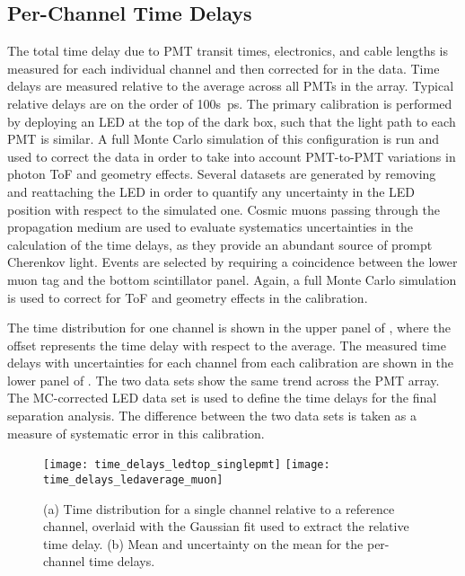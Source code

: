 \subsection{Per-Channel Time Delays}\label{s:delay}

The total time delay due to PMT transit times, electronics, and cable lengths is measured for each individual channel and then corrected for in the data. 
Time delays are measured relative to the average across all PMTs in the array. 
Typical relative delays are on the order of 100s~ps. 
The primary calibration is performed by deploying an LED at the top of the dark box, such that the light path to each PMT is similar.  A full Monte Carlo simulation of this configuration is run and used to correct the data in order to take into account PMT-to-PMT variations in photon ToF and geometry effects.  
Several datasets are generated by removing and reattaching the LED in order to quantify any uncertainty in the LED position with respect to the simulated one. 
Cosmic muons passing through the propagation medium are used to evaluate systematics uncertainties in the calculation of the time delays, as they provide an abundant source of prompt Cherenkov light. Events are selected  by requiring a coincidence between the lower muon tag and the bottom scintillator panel. Again, a full Monte Carlo simulation is used to correct for ToF and geometry effects in the calibration.  

The time distribution for one channel is shown in the upper panel of , where the offset represents the time delay with respect to the average. 
The measured time delays with uncertainties for each channel from each calibration are shown in the lower panel of .  The two data sets show the same trend across the PMT array.  
The MC-corrected LED data set is used to define the time delays for the final separation analysis.  The difference between the two data sets is taken as a measure of  systematic error in this calibration.  


\begin{figure}
	\centering
	\texttt{[image: time\_delays\_ledtop\_singlepmt]}
	\texttt{[image: time\_delays\_ledaverage\_muon]}
	\caption{(a) Time distribution for a single channel relative to a reference channel, overlaid with the Gaussian fit used to extract the relative time delay.  (b) Mean and uncertainty on the mean for the per-channel time delays.}
	\label{fig:time_delay}
\end{figure}


